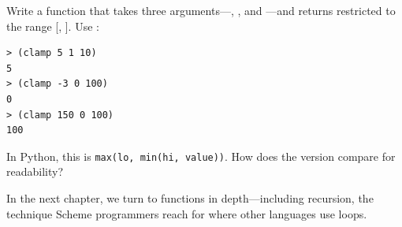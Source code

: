 \begin{exercise}
Write a function  that takes three arguments---, , and ---and returns  restricted to the range [, ]. Use :

\begin{lstlisting}[style=repl]
> (clamp 5 1 10)
5
> (clamp -3 0 100)
0
> (clamp 150 0 100)
100
\end{lstlisting}

In Python, this is \texttt{max(lo, min(hi, value))}. How does the  version compare for readability?
\end{exercise}

In the next chapter, we turn to functions in depth---including recursion, the technique Scheme programmers reach for where other languages use loops.

\chapterend
